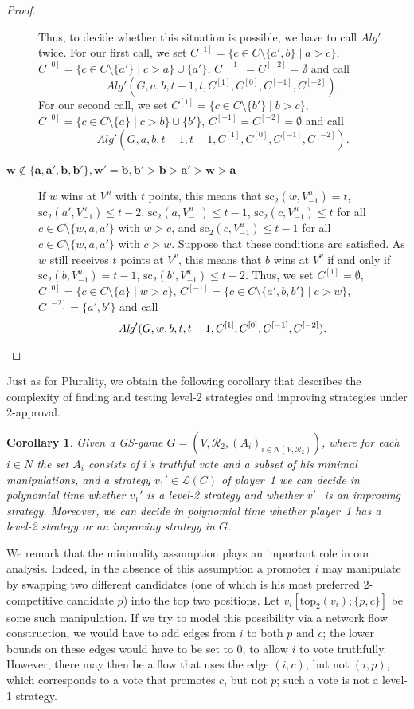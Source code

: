 \documentclass[11pt]{article}
\newtheorem{corollary}[theorem]{Corollary}
\newcommand{\calR}{\mathcal{R}}
\newcommand{\calL}{\mathcal{L}}
\newcommand{\calA}{\mathit{Alg}}
\newcommand{\tp}{\mathrm{top}}
\newcommand{\scr}{\mathrm{sc}}
\begin{document}
\begin{proof}
\begin{description}
Thus, to decide whether this situation is possible, we have to call $\calA'$ twice.
For our first call, we set 
$C^{[1]}=\{c\in C\setminus\{a', b\}\mid a > c\}$, 
$C^{[0]}=\{c\in C\setminus\{a'\}\mid c > a\}\cup \{a'\}$, 
$C^{[-1]}=C^{[-2]}=\emptyset$ and call
$$
\calA'(G, a, b, t-1, t, C^{[1]}, C^{[0]}, C^{[-1]}, C^{[-2]}).
$$
For our second call, we set $C^{[1]}=\{c\in C\setminus\{b'\}\mid b > c\}$, 
$C^{[0]}= \{c\in C\setminus\{a\}\mid c > b\}\cup\{b'\}$, 
$C^{[-1]}=C^{[-2]}=\emptyset$ and call
$$
\calA'(G, a, b, t-1, t-1, C^{[1]}, C^{[0]}, C^{[-1]}, C^{[-2]}).
$$

\item[$\boldsymbol{w\not\in\{a, a', b, b'\}, w'=b, b' > b > a' > w > a}$\ \ ] 
If $w$ wins at $V^u$ with $t$ points, this means that 
$\scr_2(w, V^{u}_{-1})=t$, $\scr_2(a', V^u_{-1})\le t-2$, $\scr_2(a, V^u_{-1})\le t-1$,
$\scr_2(c, V^u_{-1})\le t$ for all $c\in C\setminus\{w, a, a'\}$ with $w > c$, and
$\scr_2(c, V^u_{-1})\le t-1$ for all $c\in C\setminus\{w, a, a'\}$ with $c > w$.
Suppose that these conditions are satisfied. As $w$ still receives $t$ points at $V^v$, 
this means that $b$ wins at $V^v$ if and only if $\scr_2(b, V^{u}_{-1})=t-1$,
$\scr_2(b', V^{u}_{-1})\le t-2$.
Thus, we set $C^{[1]}=\emptyset$, $C^{[0]}=\{c\in C\setminus\{a\}\mid w > c\}$, 
$C^{[-1]}=\{c\in C\setminus\{a', b, b'\}\mid c > w\}$, $C^{[-2]}=\{a', b'\}$ and call
$$
\calA'(G, w, b, t, t-1, C^{[1]}, C^{[0]}, C^{[-1]}, C^{[-2]}).\qedhere
$$
\end{description}
\end{proof}

Just as for Plurality, we obtain the following corollary that describes the complexity 
of finding and testing level-2 strategies and improving strategies under 2-approval.

\begin{corollary}
Given a GS-game $G=(V, \calR_2, (A_i)_{i\in N(V, \calR_2)})$, where for each $i\in N$
the set $A_i$ consists of $i$'s truthful vote and a subset of his minimal manipulations, 
and a strategy $v_1'\in \calL(C)$ of player~1 we can decide in polynomial time
whether $v_1'$ is a level-2 strategy and whether $v'_1$ is an improving strategy. 
Moreover, we can decide in polynomial time whether player~1 has a level-2 strategy 
or an improving strategy in $G$.
\end{corollary}

We remark that the minimality assumption plays an important role in our analysis.
Indeed, in the absence of this assumption a promoter $i$ may manipulate by swapping
two different candidates (one of which is his most preferred 2-competitive candidate $p$)
into the top two positions. Let $v_i[\tp_2(v_i);\{p, c\}]$ be some such manipulation.
If we try to model this possibility via a network flow construction, we would have to add
edges from $i$ to both $p$ and $c$; the lower bounds on these edges would have to be set to 0, 
to allow $i$ to vote truthfully. However, there may then be a flow that uses
the edge $(i, c)$, but not $(i, p)$, which corresponds to 
a vote that promotes $c$, but not $p$; such a vote is not a level-1 strategy.
\end{document}
